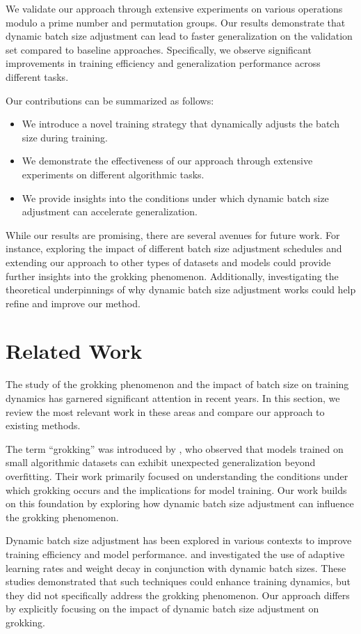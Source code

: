 \documentclass{article} %
\begin{document}
We validate our approach through extensive experiments on various operations modulo a prime number and permutation groups. Our results demonstrate that dynamic batch size adjustment can lead to faster generalization on the validation set compared to baseline approaches. Specifically, we observe significant improvements in training efficiency and generalization performance across different tasks.

Our contributions can be summarized as follows:
\begin{itemize}
    \item We introduce a novel training strategy that dynamically adjusts the batch size during training.
    \item We demonstrate the effectiveness of our approach through extensive experiments on different algorithmic tasks.
    \item We provide insights into the conditions under which dynamic batch size adjustment can accelerate generalization.
\end{itemize}

While our results are promising, there are several avenues for future work. For instance, exploring the impact of different batch size adjustment schedules and extending our approach to other types of datasets and models could provide further insights into the grokking phenomenon. Additionally, investigating the theoretical underpinnings of why dynamic batch size adjustment works could help refine and improve our method.

\section{Related Work}
\label{sec:related}

The study of the grokking phenomenon and the impact of batch size on training dynamics has garnered significant attention in recent years. In this section, we review the most relevant work in these areas and compare our approach to existing methods.

The term ``grokking'' was introduced by \citet{power2022grokking}, who observed that models trained on small algorithmic datasets can exhibit unexpected generalization beyond overfitting. Their work primarily focused on understanding the conditions under which grokking occurs and the implications for model training. Our work builds on this foundation by exploring how dynamic batch size adjustment can influence the grokking phenomenon.

Dynamic batch size adjustment has been explored in various contexts to improve training efficiency and model performance. \citet{loshchilov2017adamw} and \citet{kingma2014adam} investigated the use of adaptive learning rates and weight decay in conjunction with dynamic batch sizes. These studies demonstrated that such techniques could enhance training dynamics, but they did not specifically address the grokking phenomenon. Our approach differs by explicitly focusing on the impact of dynamic batch size adjustment on grokking.
\end{document}
